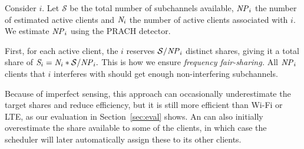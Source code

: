

Consider \eNB $i$. Let $\mathcal{S}$ be the total number of subchannels available, 
$\id{NP}_i$ the number of estimated active clients and 
$\id{N}_i$ the number of active clients associated with \eNB $i$. 
We estimate $\id{NP}_i$ using the PRACH detector.


First, for each active client, the \eNB $i$ reserves 
$\mathcal{S} / \id{NP}_i$ 
distinct shares, giving it a total share of 
$\id{S}_i =  \id{N}_i * \mathcal{S} / \id{NP}_i.$ 
This is how we ensure \emph{frequency fair-sharing.} All $\id{NP}_i$ clients that \eNB $i$ interferes with should get enough non-interfering subchannels. 

Because of imperfect sensing, this approach can occasionally underestimate the target shares and reduce efficiency, but it is still more efficient than Wi-Fi or LTE, as our evaluation in Section~\ref{sec:eval} shows. An \eNB can also initially overestimate the share available to some of the clients, in which case the scheduler will later automatically assign these to its other clients. 








